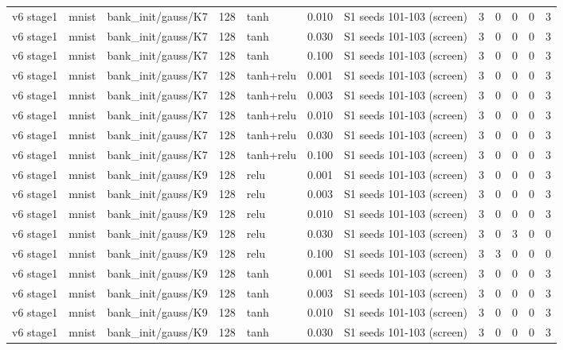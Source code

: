 \begin{table}[htbp]
{\begin{tabular}{@{}lllrlrlrrrrr@{}}
v6 stage1 & mnist & bank\_init/gauss/K7 & 128 & tanh & 0.010 & S1 seeds 101-103 (screen) & 3 & 0 & 0 & 0 & 3 \\
v6 stage1 & mnist & bank\_init/gauss/K7 & 128 & tanh & 0.030 & S1 seeds 101-103 (screen) & 3 & 0 & 0 & 0 & 3 \\
v6 stage1 & mnist & bank\_init/gauss/K7 & 128 & tanh & 0.100 & S1 seeds 101-103 (screen) & 3 & 0 & 0 & 0 & 3 \\
v6 stage1 & mnist & bank\_init/gauss/K7 & 128 & tanh+relu & 0.001 & S1 seeds 101-103 (screen) & 3 & 0 & 0 & 0 & 3 \\
v6 stage1 & mnist & bank\_init/gauss/K7 & 128 & tanh+relu & 0.003 & S1 seeds 101-103 (screen) & 3 & 0 & 0 & 0 & 3 \\
v6 stage1 & mnist & bank\_init/gauss/K7 & 128 & tanh+relu & 0.010 & S1 seeds 101-103 (screen) & 3 & 0 & 0 & 0 & 3 \\
v6 stage1 & mnist & bank\_init/gauss/K7 & 128 & tanh+relu & 0.030 & S1 seeds 101-103 (screen) & 3 & 0 & 0 & 0 & 3 \\
v6 stage1 & mnist & bank\_init/gauss/K7 & 128 & tanh+relu & 0.100 & S1 seeds 101-103 (screen) & 3 & 0 & 0 & 0 & 3 \\
v6 stage1 & mnist & bank\_init/gauss/K9 & 128 & relu & 0.001 & S1 seeds 101-103 (screen) & 3 & 0 & 0 & 0 & 3 \\
v6 stage1 & mnist & bank\_init/gauss/K9 & 128 & relu & 0.003 & S1 seeds 101-103 (screen) & 3 & 0 & 0 & 0 & 3 \\
v6 stage1 & mnist & bank\_init/gauss/K9 & 128 & relu & 0.010 & S1 seeds 101-103 (screen) & 3 & 0 & 0 & 0 & 3 \\
v6 stage1 & mnist & bank\_init/gauss/K9 & 128 & relu & 0.030 & S1 seeds 101-103 (screen) & 3 & 0 & 3 & 0 & 0 \\
v6 stage1 & mnist & bank\_init/gauss/K9 & 128 & relu & 0.100 & S1 seeds 101-103 (screen) & 3 & 3 & 0 & 0 & 0 \\
v6 stage1 & mnist & bank\_init/gauss/K9 & 128 & tanh & 0.001 & S1 seeds 101-103 (screen) & 3 & 0 & 0 & 0 & 3 \\
v6 stage1 & mnist & bank\_init/gauss/K9 & 128 & tanh & 0.003 & S1 seeds 101-103 (screen) & 3 & 0 & 0 & 0 & 3 \\
v6 stage1 & mnist & bank\_init/gauss/K9 & 128 & tanh & 0.010 & S1 seeds 101-103 (screen) & 3 & 0 & 0 & 0 & 3 \\
v6 stage1 & mnist & bank\_init/gauss/K9 & 128 & tanh & 0.030 & S1 seeds 101-103 (screen) & 3 & 0 & 0 & 0 & 3 \\

\end{tabular}}
\end{table}
